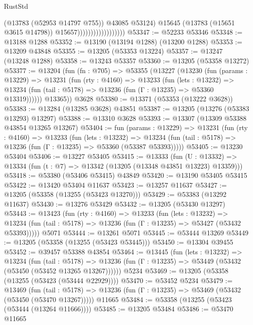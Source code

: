\begin{lexlean}{RustStd}
\begin{coremodule}
                                          (@13783 (@52953 @14797 @755))
                                          @43085
                                          @53124)
                                        @15645
                                        (@13783 (@15651 @3615 @14798))
                                        @15657))))))))))))))))))
@53347 := @52233 @53346
@53348 := @13188 @1288
@53352 := @13190 (@13194 @1288) (@13200 @1288)
@53353 := @13209 @43848
@53355 := @13205 (@53353 @13224)
@53357 := @13247 (@13248 @1288)
@53358 := @13243 @53357
@53360 := @13205 (@53358 @13272)
@53377 := @13204
    (fun (fn : @705) =>
    @53355
      (@13227
        (@13230
          (fun (params : @13229) =>
          @13231
            (fun (rty : @4160) =>
            @13233
              (fun (lets : @13232) =>
              @13234 (fun (tail : @5178) => @13236 (fun (Γ : @13235) => @53360 @13319))))))
        @13365))
    @3628
@53380 := @13371 (@53353 (@13222 @3628))
@53383 := @13284 (@13285 @3628) @43851
@53387 := @13205 (@13276 (@53383 @13293) @13297)
@53388 := @13310 @3628
@53393 := @13307 (@13309 @53388 @43854 @13265 @13267)
@53404 := fun (params : @13229) =>
  @13231
    (fun (rty : @4160) =>
    @13233
      (fun (lets : @13232) =>
      @13234 (fun (tail : @5178) => @13236 (fun (Γ : @13235) => @53360 (@53387 @53393)))))
@53405 := @13230 @53404
@53406 := @13227 @53405
@53415 := @13333
    (fun (U : @13332) => @13334 (fun (t : @7) => @13342 (@13205 (@13348 @43851 @13223) @13359)))
@53418 := @53380 (@53406 @53415) @43849
@53420 := @13190 @53405 @53415
@53422 := @13420 @53404 @11637
@53423 := @13257 @11637
@53427 := @13205 (@53358 (@13255 (@53423 @13270)))
@53429 := @53383 (@13292 @11637)
@53430 := @13276 @53429
@53432 := @13205 (@53430 @13297)
@53443 := @13423
    (fun (rty : @4160) =>
    @13233
      (fun (lets : @13232) =>
      @13234 (fun (tail : @5178) => @13236 (fun (Γ : @13235) => @53427 (@53432 @53393)))))
    @5071
@53444 := @13261 @5071
@53445 := @53444 @13269
@53449 := @13205 (@53358 (@13255 (@53423 @53445)))
@53450 := @13304 @39455
@53452 := @39457 @53388 @43854
@53464 := @13445
    (fun (lets : @13232) =>
    @13234
      (fun (tail : @5178) =>
      @13236 (fun (Γ : @13235) => @53449 (@53432 (@53450 (@53452 @13265 @13267))))))
    @5234
@53469 := @13205 (@53358 (@13255 (@53423 (@53444 @22929))))
@53470 := @53452 @5234
@53479 := @13469
    (fun (tail : @5178) => @13236 (fun (Γ : @13235) => @53469 (@53432 (@53450 (@53470 @13267)))))
    @11665
@53484 := @53358 (@13255 (@53423 (@53444 (@13264 @11666))))
@53485 := @13205 @53484
@53486 := @53470 @11665

\end{coremodule}
\end{lexlean}
